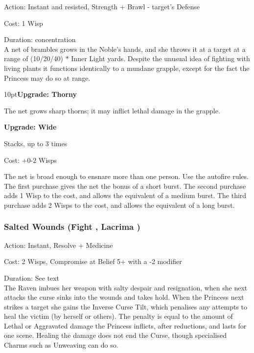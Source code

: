 \noindent Action: Instant and resisted, Strength + Brawl - target's Defense

\noindent Cost: 1 Wisp

\noindent Duration: concentration\\

\noindent A net of brambles grows in the Noble's hands, and she throws it at a target at a range of (10/20/40) * Inner Light yards. Despite the unusual idea of fighting with living plants it functions identically to a mundane grapple, except for the fact the Princess may do so at range. 

\begin{myindentpar}{10pt}\textbf{Upgrade: Thorny}

The net grows sharp thorns; it may inflict lethal damage in the grapple.

\textbf{Upgrade: Wide}

\noindent Stacks, up to 3 times

\noindent Cost: +0-2 Wisps

The net is broad enough to ensnare more than one person. Use the autofire rules. The first purchase gives the net the bonus of a short burst. The second purchase adds 1 Wisp to the cost, and allows the equivalent of a medium burst. The third purchase adds 2 Wisps to the cost, and allows the equivalent of a long burst.\end{myindentpar}

\subsubsection*{Salted Wounds (Fight \textbullet\textbullet\textbullet, Lacrima \textbullet\textbullet\textbullet)}

\noindent Action: Instant, Resolve + Medicine

\noindent Cost: 2 Wisps, Compromise at Belief 5+ with a -2 modifier

\noindent Duration: See text\\

\noindent The Raven imbues her weapon with salty despair and resignation, when she next attacks the curse sinks into the wounds and takes hold. When the Princess next strikes a target she gains the Inverse Curse Tilt, which penalises any attempts to heal the victim (by herself or others). The penalty is equal to the amount of Lethal or Aggravated damage the Princess inflicts, after reductions, and lasts for one scene. Healing the damage does not end the Curse, though specialised Charms such as Unweaving can do so.


